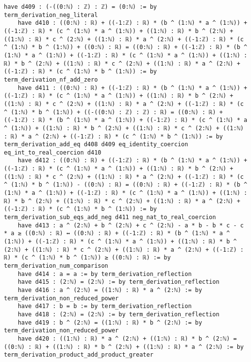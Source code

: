\documentclass{article}
\begin{document}
\begin{tcolorbox}[colback=white!10, width=\linewidth]
\begin{lstlisting}[language=Lean4]
    have d409 : (-((0:ℕ) : ℤ) : ℤ) = (0:ℕ) := by term_derivation_neg_literal
    have d410 : ((0:ℕ) : ℝ) + ((-1:ℤ) : ℝ) * (b ^ (1:ℕ) * a ^ (1:ℕ)) + ((-1:ℤ) : ℝ) * (c ^ (1:ℕ) * a ^ (1:ℕ)) + ((1:ℕ) : ℝ) * b ^ (2:ℕ) + ((1:ℕ) : ℝ) * c ^ (2:ℕ) + ((1:ℕ) : ℝ) * a ^ (2:ℕ) + ((-1:ℤ) : ℝ) * (c ^ (1:ℕ) * b ^ (1:ℕ)) + ((0:ℕ) : ℝ) = ((0:ℕ) : ℝ) + ((-1:ℤ) : ℝ) * (b ^ (1:ℕ) * a ^ (1:ℕ)) + ((-1:ℤ) : ℝ) * (c ^ (1:ℕ) * a ^ (1:ℕ)) + ((1:ℕ) : ℝ) * b ^ (2:ℕ) + ((1:ℕ) : ℝ) * c ^ (2:ℕ) + ((1:ℕ) : ℝ) * a ^ (2:ℕ) + ((-1:ℤ) : ℝ) * (c ^ (1:ℕ) * b ^ (1:ℕ)) := by term_derivation_nf_add_zero
    have d411 : ((0:ℕ) : ℝ) + ((-1:ℤ) : ℝ) * (b ^ (1:ℕ) * a ^ (1:ℕ)) + ((-1:ℤ) : ℝ) * (c ^ (1:ℕ) * a ^ (1:ℕ)) + ((1:ℕ) : ℝ) * b ^ (2:ℕ) + ((1:ℕ) : ℝ) * c ^ (2:ℕ) + ((1:ℕ) : ℝ) * a ^ (2:ℕ) + ((-1:ℤ) : ℝ) * (c ^ (1:ℕ) * b ^ (1:ℕ)) + ((-((0:ℕ) : ℤ) : ℤ) : ℝ) = ((0:ℕ) : ℝ) + ((-1:ℤ) : ℝ) * (b ^ (1:ℕ) * a ^ (1:ℕ)) + ((-1:ℤ) : ℝ) * (c ^ (1:ℕ) * a ^ (1:ℕ)) + ((1:ℕ) : ℝ) * b ^ (2:ℕ) + ((1:ℕ) : ℝ) * c ^ (2:ℕ) + ((1:ℕ) : ℝ) * a ^ (2:ℕ) + ((-1:ℤ) : ℝ) * (c ^ (1:ℕ) * b ^ (1:ℕ)) := by term_derivation_add_eq d408 d409 eq_identity_coercion eq_int_to_real_coercion d410
    have d412 : ((0:ℕ) : ℝ) + ((-1:ℤ) : ℝ) * (b ^ (1:ℕ) * a ^ (1:ℕ)) + ((-1:ℤ) : ℝ) * (c ^ (1:ℕ) * a ^ (1:ℕ)) + ((1:ℕ) : ℝ) * b ^ (2:ℕ) + ((1:ℕ) : ℝ) * c ^ (2:ℕ) + ((1:ℕ) : ℝ) * a ^ (2:ℕ) + ((-1:ℤ) : ℝ) * (c ^ (1:ℕ) * b ^ (1:ℕ)) - ((0:ℕ) : ℝ) = ((0:ℕ) : ℝ) + ((-1:ℤ) : ℝ) * (b ^ (1:ℕ) * a ^ (1:ℕ)) + ((-1:ℤ) : ℝ) * (c ^ (1:ℕ) * a ^ (1:ℕ)) + ((1:ℕ) : ℝ) * b ^ (2:ℕ) + ((1:ℕ) : ℝ) * c ^ (2:ℕ) + ((1:ℕ) : ℝ) * a ^ (2:ℕ) + ((-1:ℤ) : ℝ) * (c ^ (1:ℕ) * b ^ (1:ℕ)) := by term_derivation_sub_eqs_add_neg d411 neg_nat_to_real_coercion
    have d413 : a ^ (2:ℕ) + b ^ (2:ℕ) + c ^ (2:ℕ) - a * b - b * c - c * a ≥ ((0:ℕ) : ℝ) ↔ ((0:ℕ) : ℝ) + ((-1:ℤ) : ℝ) * (b ^ (1:ℕ) * a ^ (1:ℕ)) + ((-1:ℤ) : ℝ) * (c ^ (1:ℕ) * a ^ (1:ℕ)) + ((1:ℕ) : ℝ) * b ^ (2:ℕ) + ((1:ℕ) : ℝ) * c ^ (2:ℕ) + ((1:ℕ) : ℝ) * a ^ (2:ℕ) + ((-1:ℤ) : ℝ) * (c ^ (1:ℕ) * b ^ (1:ℕ)) ≥ ((0:ℕ) : ℝ) := by term_derivation_num_comparison
    have d414 : a = a := by term_derivation_reflection
    have d415 : (2:ℕ) = (2:ℕ) := by term_derivation_reflection
    have d416 : a ^ (2:ℕ) = ((1:ℕ) : ℝ) * a ^ (2:ℕ) := by term_derivation_non_reduced_power
    have d417 : b = b := by term_derivation_reflection
    have d418 : (2:ℕ) = (2:ℕ) := by term_derivation_reflection
    have d419 : b ^ (2:ℕ) = ((1:ℕ) : ℝ) * b ^ (2:ℕ) := by term_derivation_non_reduced_power
    have d420 : ((1:ℕ) : ℝ) * a ^ (2:ℕ) + ((1:ℕ) : ℝ) * b ^ (2:ℕ) = ((0:ℕ) : ℝ) + ((1:ℕ) : ℝ) * b ^ (2:ℕ) + ((1:ℕ) : ℝ) * a ^ (2:ℕ) := by term_derivation_product_add_product_greater

\end{lstlisting}
\end{tcolorbox}
\end{document}
